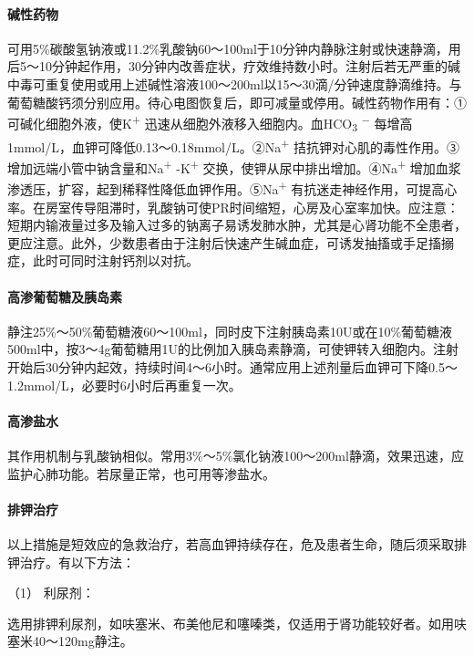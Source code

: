 \paragraph{碱性药物}

可用5\%碳酸氢钠液或11.2\%乳酸钠60～100ml于10分钟内静脉注射或快速静滴，用后5～10分钟起作用，30分钟内改善症状，疗效维持数小时。注射后若无严重的碱中毒可重复使用或用上述碱性溶液100～200ml以15～30滴/分钟速度静滴维持。与葡萄糖酸钙须分别应用。待心电图恢复后，即可减量或停用。碱性药物作用有：①可碱化细胞外液，使K\textsuperscript{+}
迅速从细胞外液移入细胞内。血HCO\textsubscript{3} \textsuperscript{−}
每增高1mmol/L，血钾可降低0.13～0.18mmol/L。②Na\textsuperscript{+}
拮抗钾对心肌的毒性作用。③增加远端小管中钠含量和Na\textsuperscript{+}
-K\textsuperscript{+} 交换，使钾从尿中排出增加。④Na\textsuperscript{+}
增加血浆渗透压，扩容，起到稀释性降低血钾作用。⑤Na\textsuperscript{+}
有抗迷走神经作用，可提高心率。在房室传导阻滞时，乳酸钠可使PR时间缩短，心房及心室率加快。应注意：短期内输液量过多及输入过多的钠离子易诱发肺水肿，尤其是心肾功能不全患者，更应注意。此外，少数患者由于注射后快速产生碱血症，可诱发抽搐或手足搐搦症，此时可同时注射钙剂以对抗。

\paragraph{高渗葡萄糖及胰岛素}

静注25\%～50\%葡萄糖液60～100ml，同时皮下注射胰岛素10U或在10\%葡萄糖液500ml中，按3～4g葡萄糖用1U的比例加入胰岛素静滴，可使钾转入细胞内。注射开始后30分钟内起效，持续时间4～6小时。通常应用上述剂量后血钾可下降0.5～1.2mmol/L，必要时6小时后再重复一次。

\paragraph{高渗盐水}

其作用机制与乳酸钠相似。常用3\%～5\%氯化钠液100～200ml静滴，效果迅速，应监护心肺功能。若尿量正常，也可用等渗盐水。

\paragraph{排钾治疗}

以上措施是短效应的急救治疗，若高血钾持续存在，危及患者生命，随后须采取排钾治疗。有以下方法：

\hypertarget{text00195.htmlux5cux23CHP6-2-1-3-2-5-1}{}
（1） 利尿剂：

选用排钾利尿剂，如呋塞米、布美他尼和噻嗪类，仅适用于肾功能较好者。如用呋塞米40～120mg静注。

